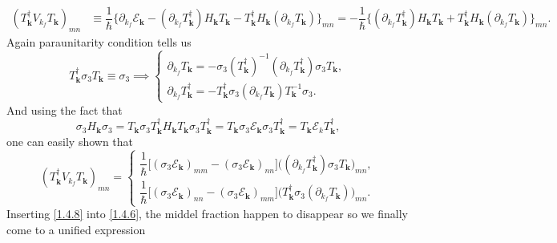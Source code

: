 \documentclass[10pt,nofootinbib]{revtex4}
\begin{document}
		\begin{align*}
			(T_{\bm{k}}^\dagger V_{k_f}T_{\bm{k}})_{mn}&\equiv\dfrac{1}{\hbar}\bigg\{\partial_{k_f}\mathscr{E}_{\bm{k}}-(\partial_{k_f}T_{\bm{k}}^\dagger)H_{\bm{k}}T_{\bm{k}}-T_{\bm{k}}^\dagger H_{\bm{k}}(\partial_{k_f}T_{\bm{k}})\bigg\}_{mn}=-\dfrac{1}{\hbar}\bigg\{(\partial_{k_f}T_{\bm{k}}^\dagger)H_{\bm{k}}T_{\bm{k}}+T_{\bm{k}}^\dagger H_{\bm{k}}(\partial_{k_f}T_{\bm{k}})\bigg\}_{mn}.
		\end{align*}
		Again paraunitarity condition tells us
		\begin{equation*}
			T_{\bm{k}}^\dagger\sigma_3 T_{\bm{k}}\equiv\sigma_3\implies \begin{cases}
				\partial_{k_f}T_{\bm{k}}=-\sigma_3(T_{\bm{k}}^\dagger)^{-1}(\partial_{k_f}T_{\bm{k}}^\dagger)\sigma_3 T_{\bm{k}},\\
				\partial_{k_f}T_{\bm{k}}^\dagger=-T_{\bm{k}}^\dagger\sigma_3(\partial_{k_f}T_{\bm{k}})T_{\bm{k}}^{-1}\sigma_3.
			\end{cases}
		\end{equation*}
		And using the fact that
		\begin{equation*}
			\sigma_3 H_{\bm{k}}\sigma_3=T_{\bm{k}}\sigma_3T_{\bm{k}}^\dagger H_{\bm{k}}T_{\bm{k}}\sigma_3 T_{\bm{k}}^\dagger=T_{\bm{k}}\sigma_3\mathscr{E}_{\bm{k}}\sigma_3 T_{\bm{k}}^\dagger=T_{\bm{k}}\mathscr{E}_{k}T_{\bm{k}}^\dagger,
		\end{equation*}
		one can easily shown that
		\begin{equation}\label{1.4.8}
			(T_{\bm{k}}^\dagger V_{k_f}T_{\bm{k}})_{mn}=\begin{cases}
				\dfrac{1}{\hbar}\bigg[(\sigma_3\mathscr{E}_{\bm{k}})_{mm}-(\sigma_3\mathscr{E}_{\bm{k}})_{nn}\bigg]\bigg((\partial_{k_f}T_{\bm{k}}^\dagger)\sigma_3 T_{\bm{k}}\bigg)_{mn},\\[1em]
				\dfrac{1}{\hbar}\bigg[(\sigma_3\mathscr{E}_{\bm{k}})_{nn}-(\sigma_3\mathscr{E}_{\bm{k}})_{mm}\bigg]\bigg(T_{\bm{k}}^\dagger\sigma_3 (\partial_{k_f}T_{\bm{k}})\bigg)_{mn}.
			\end{cases}
		\end{equation}
		Inserting \eqref{1.4.8} into \eqref{1.4.6}, the middel fraction happen to disappear so we finally come to a unified expression
\end{document}
